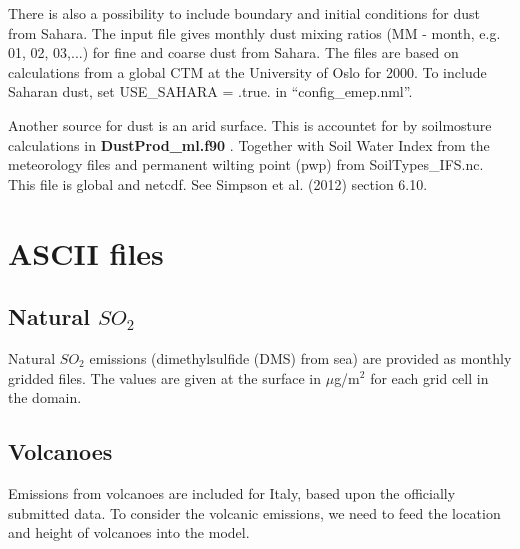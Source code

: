There is also a possibility to include boundary and initial conditions for dust from Sahara. 
The input file gives monthly dust mixing 
ratios (MM - month, e.g. 01, 02, 03,...) for fine and coarse dust from Sahara. The files are based on calculations 
from a global CTM at the University of Oslo for 2000. 
To include Saharan dust, set USE\_SAHARA = .true. in ``config\_emep.nml''.

Another source for dust is an arid surface. This is accountet for by soilmosture calculations in {\bf DustProd\_ml.f90 }. 
Together with Soil Water Index from the meteorology files and permanent wilting point (pwp) from SoilTypes\_IFS.nc. 
This file is global and netcdf. See Simpson et al. (2012) section 6.10.



\section{ASCII files}


% 
% 
% 
% 



\subsection{Natural $SO_2$}
Natural $SO_2$ emissions (dimethylsulfide (DMS) from sea) are provided 
as monthly gridded files.  
The values are given at the surface in $\mu$g/m$^2$ for each grid cell in the domain. 

\subsection{Volcanoes}

Emissions from volcanoes are included for Italy, based upon the
officially submitted data.
To consider the volcanic emissions, we need to feed the location
and height of volcanoes into the model. 

